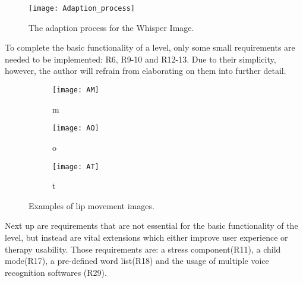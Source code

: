 \documentclass[draft,final]{vutinfth} %
\begin{document}
\begin{figure}
\begin{center}
\texttt{[image: Adaption\_process]}
\end{center}
\caption{The adaption process for the Whisper Image.}
\end{figure}

 
To complete the basic functionality of a level, only some small requirements are needed to be implemented: R6, R9-10 and R12-13. Due to their simplicity, however, the author will refrain from elaborating on them into further detail. \\
\begin{figure}
\begin{subfigure}{.33\textwidth}
  \centering
  \texttt{[image: AM]}
  \caption{m}
\end{subfigure}%
\begin{subfigure}{.33\textwidth}
  \centering
  \texttt{[image: AO]}
  \caption{o}
\end{subfigure}
\begin{subfigure}{.33\textwidth}
  \centering
  \texttt{[image: AT]}
  \caption{t}
\end{subfigure}
\caption{Examples of lip movement images.}
\end{figure}

Next up are requirements that are not essential for the basic functionality of the level, but instead are vital extensions which either improve user experience or therapy usability. Those requirements are: a stress component(R11), a child mode(R17), a pre-defined word list(R18) and the usage of multiple voice recognition softwares (R29).
\end{document}
